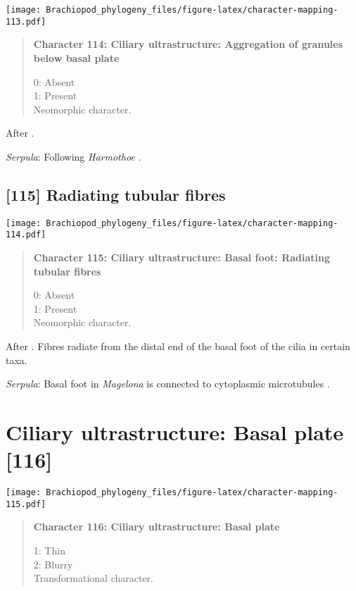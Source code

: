 \documentclass[openany]{book}
\theoremstyle{definition}
\theoremstyle{definition}
\theoremstyle{definition}
\theoremstyle{remark}
\begin{document}
\texttt{[image: Brachiopod\_phylogeny\_files/figure-latex/character-mapping-113.pdf]}

\begin{quote}
\textbf{Character 114: Ciliary ultrastructure: Aggregation of granules
below basal plate}

0: Absent\\
1: Present\\
Neomorphic character.
\end{quote}

After \citet{Lundin2009}.

\hypertarget{Serpula-coding-114}{}
\emph{Serpula}: Following \emph{Harmothoe} \citep{Holborow1969}.

\subsection*{{[}115{]} Radiating tubular
fibres}\label{radiating-tubular-fibres}

\texttt{[image: Brachiopod\_phylogeny\_files/figure-latex/character-mapping-114.pdf]}

\begin{quote}
\textbf{Character 115: Ciliary ultrastructure: Basal foot: Radiating
tubular fibres}

0: Absent\\
1: Present\\
Neomorphic character.
\end{quote}

After \citet{Lundin2009}. Fibres radiate from the distal end of the
basal foot of the cilia in certain taxa.

\hypertarget{Serpula-coding-115}{}
\emph{Serpula}: Basal foot in \emph{Magelona} is connected to
cytoplasmic microtubules \citep{Bartolomaeus1995}.

\section{Ciliary ultrastructure: Basal plate
{[}116{]}}\label{ciliary-ultrastructure-basal-plate-116}

\texttt{[image: Brachiopod\_phylogeny\_files/figure-latex/character-mapping-115.pdf]}

\begin{quote}
\textbf{Character 116: Ciliary ultrastructure: Basal plate}

1: Thin\\
2: Blurry\\
Transformational character.
\end{quote}
\end{document}
